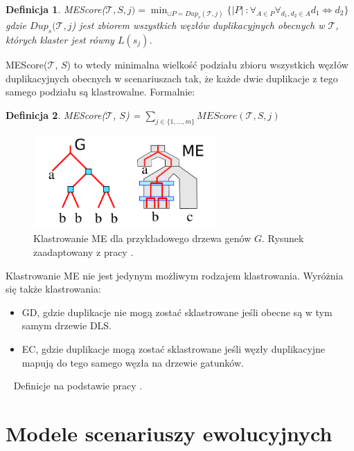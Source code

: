 \documentclass[licencjacka]{pracamgr}
\newtheorem{defi}{Definicja}[section]
\begin{document}
\begin{defi}\label{MEs}
  MEScore($\mathcal{T}, S, j) = \min_{\cup P = {Dup}_s(\mathcal{T},j)} \lbrace \vert P \vert\ : \forall_{A \in P} \forall_{d_1,d_2 \in A} d_1 \Longleftrightarrow d_2 \rbrace$
 gdzie ${Dup}_s(\mathcal{T},j$) jest zbiorem wszystkich węzłów duplikacyjnych obecnych w $\mathcal{T}$, których klaster jest równy $L(s_j)$. 
\end{defi}


MEScore($\mathcal{T}$, $S$) to wtedy minimalna wielkość podziału zbioru wszystkich węzłów duplikacyjnych obecnych w scenariuszach tak, że każde dwie duplikacje z tego samego podziału są klastrowalne. Formalnie:

\begin{defi}\label{ME}
  MEScore($\mathcal{T}$, $S$) = $\sum_{j \in \{1,\dots,m\}} MEScore(\mathcal{T}, S, j)$
\end{defi}

\begin{figure}[H]
  \centering
  \includegraphics[width=70mm]{./pictures/clas_type_me.png}
  \caption{Klastrowanie ME dla przykładowego drzewa genów $G$. Rysunek zaadaptowany z pracy \cite{RME}.}
\end{figure}


Klastrowanie ME nie jest jedynym możliwym rodzajem klastrowania. Wyróżnia się także klastrowania:
\begin{itemize}
\item GD, gdzie duplikacje nie mogą zostać sklastrowane jeśli obecne są w tym samym drzewie DLS.
\item EC, gdzie duplikacje mogą zostać sklastrowane jeśli węzły duplikacyjne mapują do tego samego węzła na drzewie gatunków.
\end{itemize}
~\linebreak
Definicje na podstawie pracy \cite{RME}.

\section{Modele scenariuszy ewolucyjnych}
\end{document}
